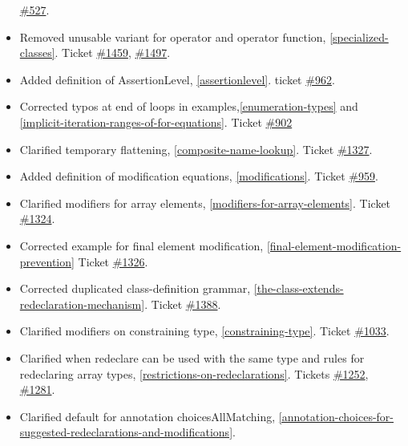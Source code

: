 \begin{itemize}
  \href{https://github.com/modelica/ModelicaSpecification/issues/527}{\#527}.
\item
  Removed unusable variant for operator and operator function, \autoref{specialized-classes}. Ticket
  \href{https://github.com/modelica/ModelicaSpecification/issues/1459}{\#1459},
  \href{https://github.com/modelica/ModelicaSpecification/issues/1497}{\#1497}.
\item
  Added definition of AssertionLevel, \autoref{assertionlevel}. ticket
  \href{https://github.com/modelica/ModelicaSpecification/issues/962}{\#962}.
\item
  Corrected typos at end of loops in examples,\autoref{enumeration-types} and
  \autoref{implicit-iteration-ranges-of-for-equations}. Ticket
  \href{https://github.com/modelica/ModelicaSpecification/issues/902}{\#902}
\item
  Clarified temporary flattening, \autoref{composite-name-lookup}. Ticket
  \href{https://github.com/modelica/ModelicaSpecification/issues/1327}{\#1327}.
\item
  Added definition of modification equations, \autoref{modifications}. Ticket
  \href{https://github.com/modelica/ModelicaSpecification/issues/959}{\#959}.
\item
  Clarified modifiers for array elements, \autoref{modifiers-for-array-elements}. Ticket
  \href{https://github.com/modelica/ModelicaSpecification/issues/1324}{\#1324}.
\item
  Corrected example for final element modification, \autoref{final-element-modification-prevention}
  Ticket \href{https://github.com/modelica/ModelicaSpecification/issues/1326}{\#1326}.
\item
  Corrected duplicated class-definition grammar, \autoref{the-class-extends-redeclaration-mechanism}. Ticket
  \href{https://github.com/modelica/ModelicaSpecification/issues/1388}{\#1388}.
\item
  Clarified modifiers on constraining type, \autoref{constraining-type}. Ticket
  \href{https://github.com/modelica/ModelicaSpecification/issues/1033}{\#1033}.
\item
  Clarified when redeclare can be used with the same type and rules for
  redeclaring array types, \autoref{restrictions-on-redeclarations}. Tickets
  \href{https://github.com/modelica/ModelicaSpecification/issues/1252}{\#1252},
  \href{https://github.com/modelica/ModelicaSpecification/issues/1281}{\#1281}.
\item
  Clarified default for annotation choicesAllMatching, \autoref{annotation-choices-for-suggested-redeclarations-and-modifications}.

\end{itemize}
